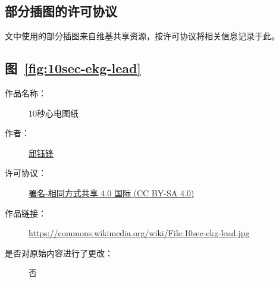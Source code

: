 \begin{appendix}

    \begingroup
    \renewcommand{\clearpage}{\relax}
    \listoftodos
    \endgroup

    \listoffigures
    \listoffigureEng


    \chapter*{部分插图的许可协议}\label{ch:license}

    文中使用的部分插图来自维基共享资源，按许可协议将相关信息记录于此。

    \section*{图~\ref{fig:10sec-ekg-lead}}

    \begin{description}
        \item[作品名称：]10秒心电图纸
        \item[作者：]\href{https://zh.wikipedia.org/wiki/User:Kuyohong}{邱钰锋}
        \item[许可协议：]\href{https://creativecommons.org/licenses/by/4.0/}{署名-相同方式共享 4.0 国际 (CC BY-SA 4.0)}
        \item[作品链接：]\url{https://commons.wikimedia.org/wiki/File:10sec-ekg-lead.jpg}
        \item[是否对原始内容进行了更改：]否
    \end{description}

\end{appendix}
